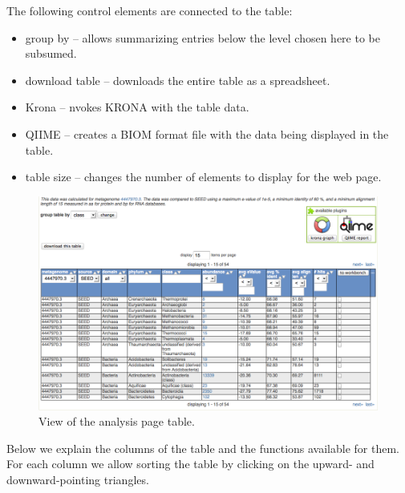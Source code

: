 \documentclass[12pt,fullpage]{report}
\begin{document}
The following control elements are connected to the table:
\begin{itemize}
\item group by --
allows summarizing entries below the level chosen here to be subsumed.

\item download table --
downloads the entire table as a spreadsheet.

\item Krona --
 nvokes KRONA \cite{KRONA} with the table data.

\item QIIME --
creates a BIOM\cite{BIOM} format file with the data being displayed in the table.

\item table size --
changes the number of elements to display for the web page.

\end{itemize}

\begin{figure}[ht]
\begin{center}
\includegraphics[width=6in]{Images/analysis-page-table.png}
\end{center}
\caption{
View of the analysis page table.
}
\label{fig:analysis-page-table}
\end{figure}

Below we explain the columns of the table and the functions available for them.
For each column we allow sorting the table by clicking on the upward- and downward-pointing triangles.
\end{document}
